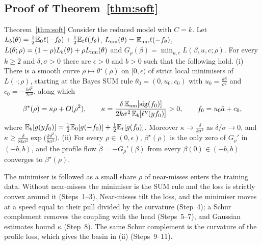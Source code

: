 \subsection{Proof of Theorem~\ref*{thm:soft}}\label{app:thm4}

\begin{restated}{Theorem~\ref{thm:soft}}
Consider the reduced model with $C=k$. Let $L_b(\theta)=\frac12\mathbb{E}_0\ell(-f_\theta)+\frac12\mathbb{E}_t\ell(f_\theta)$, $L_{\mathrm{nm}}(\theta)=\mathbb{E}_{\mathrm{nm}}\ell(-f_\theta)$, $L(\theta;\rho)=(1-\rho)L_b(\theta)+\rho L_{\mathrm{nm}}(\theta)$ and $G_\rho(\beta)=\min_{u,c}L(\beta,u,c;\rho)$. For every $k\ge2$ and $\delta,\sigma>0$ there are $\epsilon>0$ and $b>0$ such that the following hold.
(i) There is a smooth curve $\rho\mapsto\theta^\star(\rho)$ on $[0,\epsilon)$ of strict local minimisers of $L(\cdot;\rho)$, starting at the Bayes SUM rule $\theta_0=(0,u_0,c_0)$ with $u_0=\frac{k\delta}{\sigma^2}$ and $c_0=-\frac{k\delta^2}{2\sigma^2}$, along which
\begin{equation}\label{eq:thm4}
  \beta^\star(\rho)=\kappa\rho+O(\rho^2),
  \qquad
  \kappa=\frac{\delta\,\mathbb{E}_{\mathrm{nm}}[\operatorname{sig}(f_0)]}{2k\sigma^2\,\mathbb{E}_b[\ell''(yf_0)]}>0,
  \qquad
  f_0=u_0\bar a+c_0,
\end{equation}
where $\mathbb{E}_b[g(yf_0)]=\frac12\mathbb{E}_0[g(-f_0)]+\frac12\mathbb{E}_t[g(f_0)]$. Moreover $\kappa\to\frac{\delta}{k\sigma^2}$ as $\delta/\sigma\to0$, and $\kappa\ge\frac{\delta}{8k\sigma^2}\exp\big(\frac{k\delta^2}{8\sigma^2}\big)$.
(ii) For every $\rho\in(0,\epsilon)$, $\beta^\star(\rho)$ is the only zero of $G_\rho'$ in $(-b,b)$, and the profile flow $\dot\beta=-G_\rho'(\beta)$ from every $\beta(0)\in(-b,b)$ converges to $\beta^\star(\rho)$.
\end{restated}

The minimiser is followed as a small share $\rho$ of near-misses enters the training data. Without near-misses the minimiser is the SUM rule and the loss is strictly convex around it (Steps~1--3). Near-misses tilt the loss, and the minimiser moves at a speed equal to their pull divided by the curvature (Step~4); a Schur complement removes the coupling with the head (Steps~5--7), and Gaussian estimates bound $\kappa$ (Step~8). The same Schur complement is the curvature of the profile loss, which gives the basin in (ii) (Steps~9--11).


